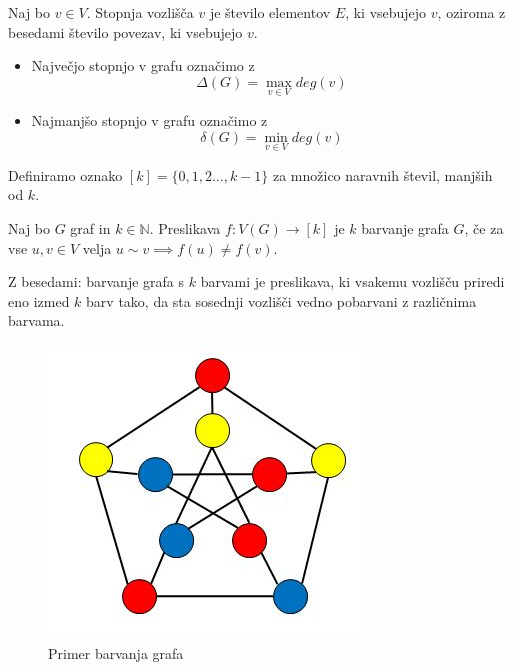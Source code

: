 \documentclass[mat1]{fmfdelo}
\begin{document}
\begin{definicija}
    Naj bo $v\in V$. Stopnja vozlišča $v$ je število elementov $E$, ki vsebujejo $v$, oziroma z besedami število povezav, ki vsebujejo $v$. 
\end{definicija}

\begin{itemize}
    \item Največjo stopnjo v grafu označimo z \[\Delta (G) = \max_{v\in V} deg(v)\]
    \item Najmanjšo stopnjo v grafu označimo z \[\delta (G) = \min_{v\in V} deg(v)\]
\end{itemize}

\begin{definicija}
    Definiramo oznako $[k] = \{0, 1, 2 \dots, k-1\}$ za množico naravnih števil, manjših od $k$.
\end{definicija}

\begin{definicija}
    Naj bo $G$ graf in $k\in \mathbb{N}$. Preslikava $f:V(G)\to [k]$ je $k$ barvanje grafa $G$, če za vse $u, v\in V$ velja $u\sim v \implies f(u)\neq f(v)$.
\end{definicija}
Z besedami: barvanje grafa s $k$ barvami je preslikava, ki vsakemu vozlišču priredi eno izmed $k$ barv tako, da sta sosednji vozlišči vedno pobarvani z različnima barvama.
\begin{figure}[H]
    \begin{center}
    \includegraphics[scale=0.5]{assets/coloring}
    \caption{Primer barvanja grafa}
    \label{slika2}
    \end{center}
    \end{figure}
    
\end{document}
